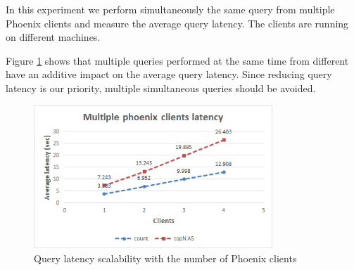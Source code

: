 In this experiment we perform simultaneously the same query from multiple Phoenix clients and measure the average query latency. The clients are running on different machines. 

Figure \ref{figure:benchmarks_hbase_phoenix_clients} shows that multiple queries performed at the same time from different have an additive impact on the average query latency. Since reducing query latency is our priority, multiple simultaneous queries should be avoided.

\begin{figure}[H]
\centering
\includegraphics[width=0.8\textwidth]{figures/benchmarks_hbase_phoenix_clients}
\caption{Query latency scalability with the number of Phoenix clients}
\label{figure:benchmarks_hbase_phoenix_clients}
\end{figure}


\cleardoublepage
